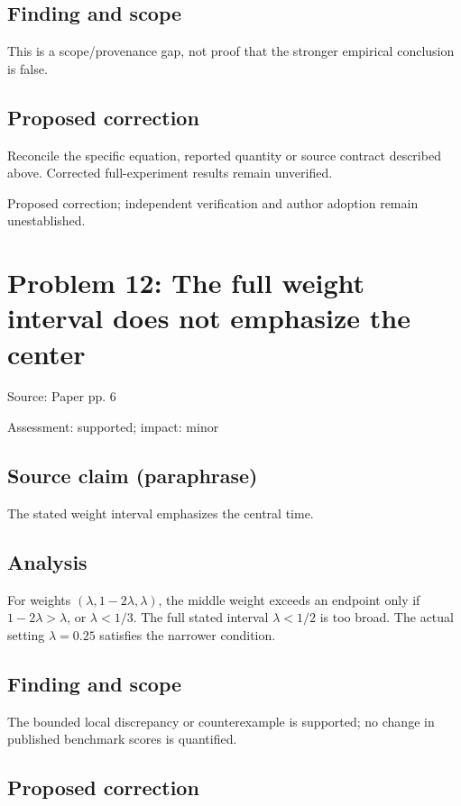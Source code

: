 \documentclass[11pt]{article}
\begin{document}
\subsection*{Finding and scope}

This is a scope/provenance gap, not proof that the stronger empirical conclusion is false.

\subsection*{Proposed correction}

Reconcile the specific equation, reported quantity or source contract described above. Corrected full-experiment results remain unverified.

Proposed correction; independent verification and author adoption remain unestablished.

\section*{Problem 12: The full weight interval does not emphasize the center}

Source: Paper pp. 6

Assessment: supported; impact: minor

\subsection*{Source claim (paraphrase)}

The stated weight interval emphasizes the central time.

\subsection*{Analysis}

For weights \((\lambda,1-2\lambda,\lambda)\), the middle weight exceeds an endpoint only if \(1-2\lambda>\lambda\), or \(\lambda<1/3\). The full stated interval \(\lambda<1/2\) is too broad. The actual setting \(\lambda=0.25\) satisfies the narrower condition.

\subsection*{Finding and scope}

The bounded local discrepancy or counterexample is supported; no change in published benchmark scores is quantified.

\subsection*{Proposed correction}
\end{document}
